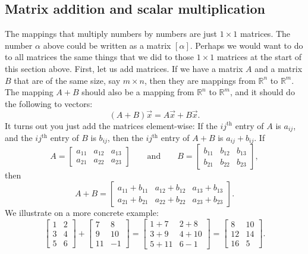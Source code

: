 \subsection{Matrix addition and scalar multiplication}

The mappings that multiply numbers by numbers are just $1 \times 1$ matrices.  The
number $\alpha$ above could be written as a matrix $[\alpha]$.
Perhaps we would want to do to all matrices the same things that we
did to those $1 \times 1$ matrices at the start of this section above.
First, let us add matrices.
If we have a matrix $A$ and a matrix $B$ that are of the same size,
say $m \times n$, then they are mappings from
${\mathbb{R}}^n$ to ${\mathbb{R}}^m$.  The mapping $A+B$ should also be a mapping from
${\mathbb{R}}^n$ to ${\mathbb{R}}^m$, and it should do the following to
vectors:
\begin{equation*}
(A+B) \vec{x} = A\vec{x} + B \vec{x} .
\end{equation*}
It turns out you just add the matrices element-wise:  If the
$ij^{\text{th}}$ entry of $A$ is $a_{ij}$, and the
$ij^{\text{th}}$ entry of $B$ is $b_{ij}$, then the
$ij^{\text{th}}$ entry of $A+B$ is $a_{ij} + b_{ij}$.  If
\begin{equation*}
A =
\begin{bmatrix}
a_{11} & a_{12} & a_{13}  \\
a_{21} & a_{22} & a_{23}
\end{bmatrix}
\qquad \text{and} \qquad
B =
\begin{bmatrix}
b_{11} & b_{12} & b_{13}  \\
b_{21} & b_{22} & b_{23}
\end{bmatrix} ,
\end{equation*}
then
\begin{equation*}
A+B =
\begin{bmatrix}
a_{11} + b_{11} & a_{12} + b_{12} & a_{13} + b_{13}  \\
a_{21} + b_{21} & a_{22} + b_{22} & a_{23} + b_{23}
\end{bmatrix} .
\end{equation*}
We illustrate on a more concrete example:
\begin{equation*}
\begin{bmatrix}
1 & 2 \\
3 & 4 \\
5 & 6
\end{bmatrix}
+
\begin{bmatrix}
7 & 8 \\
9 & 10 \\
11 & -1
\end{bmatrix}
=
\begin{bmatrix}
1+7 & 2+8 \\
3+9 & 4+10 \\
5+11 & 6-1
\end{bmatrix}
=
\begin{bmatrix}
8 & 10 \\
12 & 14 \\
16 & 5
\end{bmatrix} .
\end{equation*}
